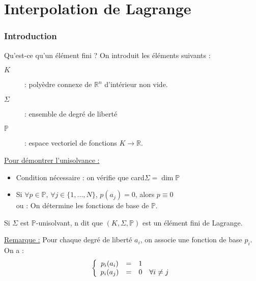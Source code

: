 \part{Interpolation de Lagrange}

\section*{Introduction}
Qu'est-ce qu'un élément fini ? On introduit les éléments suivants :
\begin{description}
	\item[$K$] : polyèdre connexe de $\mathbb{R}^n$ d'intérieur non vide.
	\item[$\Sigma$] : ensemble de degré de liberté
	\item[$\mathbb{P}$] : espace vectoriel de fonctions $K\to\mathbb{R}$.
\end{description}


\underline{Pour démontrer l'unisolvance :}
\begin{itemize}
	\item Condition nécessaire : on vérifie que card$\Sigma=\dim \mathbb{P}$
	\item Si $\forall p\in \mathbb{P}$, $\forall j\in\{1,...,N\}$, $p(a_j)=0$, alors $p\equiv 0$\\
		ou : On détermine les fonctions de base de $\mathbb{P}$.
\end{itemize}

Si $\Sigma$ est $\mathbb{P}$-unisolvant, n dit que $(K,\Sigma,\mathbb{P})$ est un élément fini de Lagrange.

\bigskip
\underline{Remarque :} Pour chaque degré de liberté $a_i$, on associe une fonction de base $p_i$. On a :
	\[\left\{ \begin{array}{c c c c}
		p_i(a_i)&=&1\\
		p_i(a_j)&=&0 & \forall i\neq j
	\end{array}\right.\]
